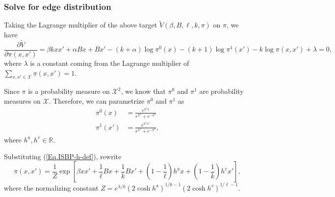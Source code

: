 \documentclass[12pt]{article}
\numberwithin{equation}{section}
\begin{document}
\subsubsection{Solve for edge distribution}

Taking the Lagrange multiplier of the above target $\widetilde{V}(\beta, B, \ell, k, \pi)$ on $\pi$, we have
\begin{equation*}
    \frac{\partial \widetilde{V}}{\partial \pi(x, x')} = \beta k x x' + \alpha B x + B x' - (k+\alpha) \log \pi^0(x) - (k+1)\log\pi^1(x') - k\log\pi(x, x') + \lambda = 0,
\end{equation*}
where $\lambda$ is a constant coming from the Lagrange multiplier of $\sum_{x, x'\in\mathcal{X}} \pi(x, x') = 1$.

Since $\pi$ is a probability measure on $\mathcal{X}^2$, we know that $\pi^0$ and $\pi^1$ are probability measures on $\mathcal{X}$.
Therefore, we can parametrize $\pi^0$ and $\pi^1$ as
\begin{equation}
    \begin{aligned}
        \pi^0(x)  & = \frac{e^{h^a x}}{e^{h^a} + e^{-h^a}}   \\
        \pi^1(x') & = \frac{e^{h^v x'}}{e^{h^v} + e^{-h^v}},
    \end{aligned}
    \label{Eq.ISBP-h-def}
\end{equation}
where $h^a, h^v\in\mathbb{R}$.

Substituting (\ref{Eq.ISBP-h-def}), rewrite
\begin{equation}
    \pi(x, x') = \frac1Z \exp\left[\beta xx' + \frac1\ell Bx + \frac1kBx' + \left(1-\frac1\ell\right)h^ax + \left(1-\frac1k\right)h^vx'\right],
\end{equation}
where the normalizing constant $Z=e^{\lambda/k}(2\cosh h^a)^{1/k-1}(2\cosh h^v)^{1/\ell-1}$.
\end{document}
